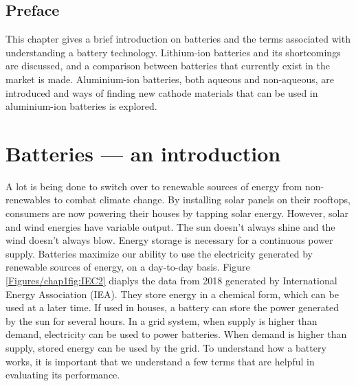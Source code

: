 
\section*{\centering Preface}
This chapter gives a brief introduction on batteries and the terms associated with understanding a battery technology. Lithium-ion batteries and its shortcomings are discussed, and a comparison between batteries that currently exist in the market is made. Aluminium-ion batteries, both aqueous and non-aqueous, are introduced and ways of finding new cathode materials that can be used in aluminium-ion batteries is explored.
\newpage
\chapter{Batteries --- an introduction} %
 \label{chap1} %
\newcommand{\keyword}[1]{\textbf{#1}}
\newcommand{\tabhead}[1]{\textbf{#1}}
\newcommand{\code}[1]{\texttt{#1}}
\newcommand{\file}[1]{\texttt{\bfseries#1}}
\newcommand{\option}[1]{\texttt{\itshape#1}}

A lot is being done to switch over to renewable sources of energy from non-renewables to combat climate change. By installing solar panels on their rooftops, consumers are now powering their houses by tapping solar energy. However, solar and wind energies have variable output. The sun doesn't always shine and the wind doesn't always blow. Energy storage is necessary for a continuous power supply. Batteries maximize our ability to use the electricity generated by renewable sources of energy, on a day-to-day basis. Figure \ref{Figures/chap1fig:IEC2} diaplys the data from 2018 generated by International Energy Association (IEA). They store energy in a chemical form, which can be used at a later time. If used in houses, a battery can store the power generated by the sun for several hours. In a grid system, when supply is higher than demand, electricity can be used to power batteries. When demand is higher than supply, stored energy can be used by the grid. To understand how a battery works, it is important that we understand a few terms that are helpful in evaluating its performance. 

